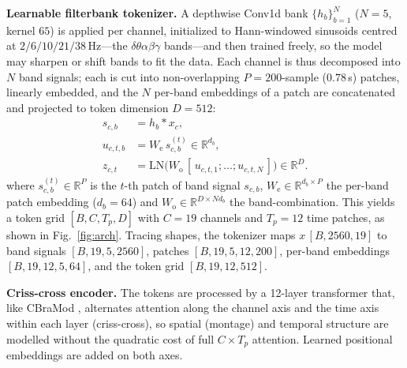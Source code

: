 \documentclass[letterpaper]{article} %
\begin{document}
\noindent\textbf{Learnable filterbank tokenizer.} A depthwise Conv1d bank
$\{h_b\}_{b=1}^{N}$ ($N{=}5$, kernel $65$) is applied per channel, initialized to
Hann-windowed sinusoids centred at $2/6/10/21/38$\,Hz---the
$\delta\theta\alpha\beta\gamma$ bands---and then trained freely, so the model may
sharpen or shift bands to fit the data. Each channel is thus decomposed into $N$
band signals; each is cut into non-overlapping $P{=}200$-sample ($0.78$\,s)
patches, linearly embedded, and the $N$ per-band embeddings of a patch are
concatenated and projected to token dimension $D{=}512$:
\begin{align}
s_{c,b}   &= h_b * x_c, \label{eq:filt}\\
u_{c,t,b} &= W_{\mathrm e}\,s^{(t)}_{c,b}\in\mathbb{R}^{d_b}, \label{eq:embed}\\
z_{c,t}   &= \mathrm{LN}\!\big(W_{\mathrm o}\,[\,u_{c,t,1};\dots;u_{c,t,N}\,]\big)\in\mathbb{R}^{D}. \label{eq:tok}
\end{align}
where $s^{(t)}_{c,b}\in\mathbb{R}^{P}$ is the $t$-th patch of band signal $s_{c,b}$,
$W_{\mathrm e}\in\mathbb{R}^{d_b\times P}$ the per-band patch embedding
($d_b{=}64$) and $W_{\mathrm o}\in\mathbb{R}^{D\times Nd_b}$ the band-combination.
This yields a token grid $[B,C,T_p,D]$ with $C{=}19$ channels and $T_p{=}12$ time
patches, as shown in Fig.~\ref{fig:arch}. Tracing shapes, the tokenizer maps $x\,[B,2560,19]$
to band signals $[B,19,5,2560]$, patches $[B,19,5,12,200]$, per-band embeddings
$[B,19,12,5,64]$, and the token grid $[B,19,12,512]$.

\noindent\textbf{Criss-cross encoder.} The tokens are processed by a 12-layer
transformer that, like CBraMod \cite{wang2025cbramod}, alternates attention along
the channel axis and the time axis within each layer (criss-cross), so spatial
(montage) and temporal structure are modelled without the quadratic cost of full
$C{\times}T_p$ attention. Learned positional embeddings are added on both axes.
\end{document}
